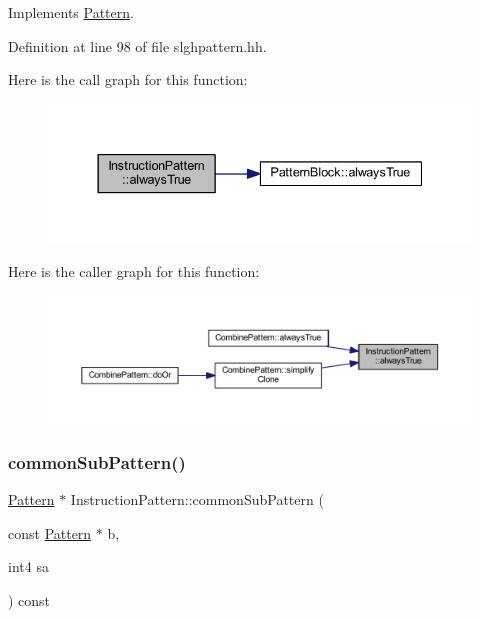 Implements \mbox{\hyperlink{class_pattern_ab1527189c63b797a70c23047c033d35f}{Pattern}}.



Definition at line 98 of file slghpattern.\+hh.

Here is the call graph for this function\+:
\nopagebreak
\begin{figure}[H]
\begin{center}
\leavevmode
\includegraphics[width=337pt]{class_instruction_pattern_a06048b3a010b4822734d34774184f02d_cgraph}
\end{center}
\end{figure}
Here is the caller graph for this function\+:
\nopagebreak
\begin{figure}[H]
\begin{center}
\leavevmode
\includegraphics[width=350pt]{class_instruction_pattern_a06048b3a010b4822734d34774184f02d_icgraph}
\end{center}
\end{figure}
\mbox{\label{class_instruction_pattern_a22b45bc904929f0f094a0a64174bb70c}} 
\subsubsection{\texorpdfstring{commonSubPattern()}{commonSubPattern()}}
{\footnotesize\ttfamily \mbox{\hyperlink{class_pattern}{Pattern}} $\ast$ Instruction\+Pattern\+::common\+Sub\+Pattern (\begin{DoxyParamCaption}\item[{const \mbox{\hyperlink{class_pattern}{Pattern}} $\ast$}]{b,  }\item[{int4}]{sa }\end{DoxyParamCaption}) const\hspace{0.3cm}{\ttfamily [virtual]}}



